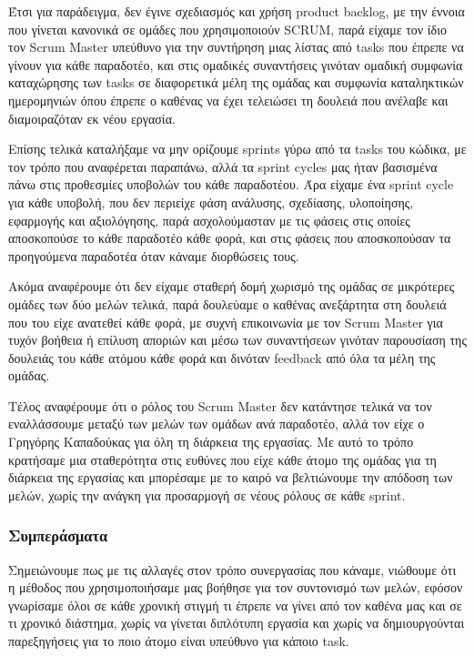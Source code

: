 \documentclass[12pt,a4paper]{article}
\begin{document}
Έτσι για παράδειγμα, δεν έγινε σχεδιασμός και χρήση product backlog, με την έννοια που γίνεται κανονικά σε ομάδες που χρησιμοποιούν SCRUM, παρά είχαμε τον ίδιο τον Scrum Master υπεύθυνο για την συντήρηση μιας λίστας από tasks που έπρεπε να γίνουν για κάθε παραδοτέο, και στις ομαδικές συναντήσεις γινόταν ομαδική συμφωνία καταχώρησης των tasks σε διαφορετικά μέλη της ομάδας και συμφωνία καταληκτικών ημερομηνιών όπου έπρεπε ο καθένας να έχει τελειώσει τη δουλειά που ανέλαβε και διαμοιραζόταν εκ νέου εργασία.

Επίσης τελικά καταλήξαμε να μην ορίζουμε sprints γύρω από τα tasks του κώδικα, με τον τρόπο που αναφέρεται παραπάνω, αλλά τα sprint cycles μας ήταν βασισμένα πάνω στις προθεσμίες υποβολών του κάθε παραδοτέου. Άρα είχαμε ένα sprint cycle για κάθε υποβολή, που δεν περιείχε φάση ανάλυσης, σχεδίασης, υλοποίησης, εφαρμογής και αξιολόγησης, παρά ασχολούμασταν με τις φάσεις στις οποίες αποσκοπούσε το κάθε παραδοτέο κάθε φορά, και στις φάσεις που αποσκοπούσαν τα προηγούμενα παραδοτέα όταν κάναμε διορθώσεις τους.

Ακόμα αναφέρουμε ότι δεν είχαμε σταθερή δομή χωρισμό της ομάδας σε μικρότερες ομάδες των δύο μελών τελικά, παρά δουλεύαμε ο καθένας ανεξάρτητα στη δουλειά που του είχε ανατεθεί κάθε φορά, με συχνή επικοινωνία με τον Scrum Master για τυχόν βοήθεια ή επίλυση αποριών και μέσω των συναντήσεων γινόταν παρουσίαση της δουλειάς του κάθε ατόμου κάθε φορά και δινόταν feedback από όλα τα μέλη της ομάδας.

Τέλος αναφέρουμε ότι ο ρόλος του Scrum Master δεν κατάντησε τελικά να τον εναλλάσσουμε μεταξύ των μελών των ομάδων ανά παραδοτέο, αλλά τον είχε ο Γρηγόρης Καπαδούκας για όλη τη διάρκεια της εργασίας. Με αυτό το τρόπο κρατήσαμε μια σταθερότητα στις ευθύνες που είχε κάθε άτομο της ομάδας για τη διάρκεια της εργασίας και μπορέσαμε με το καιρό να βελτιώνουμε την απόδοση των μελών, χωρίς την ανάγκη για προσαρμογή σε νέους ρόλους σε κάθε sprint.

\subsubsection{Συμπεράσματα}
Σημειώνουμε πως με τις αλλαγές στον τρόπο συνεργασίας που κάναμε, νιώθουμε ότι η μέθοδος που χρησιμοποιήσαμε μας βοήθησε για τον συντονισμό των μελών, εφόσον γνωρίσαμε όλοι σε κάθε χρονική στιγμή τι έπρεπε να γίνει από τον καθένα μας και σε τι χρονικό διάστημα, χωρίς να γίνεται διπλότυπη εργασία και χωρίς να δημιουργούνται παρεξηγήσεις για το ποιο άτομο είναι υπεύθυνο για κάποιο task.
\end{document}
